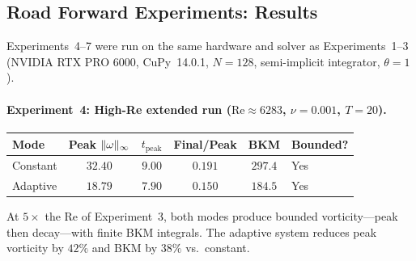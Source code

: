 \subsection{Road Forward Experiments: Results}
\label{app:ns:road_data}

Experiments~4--7 were run on the same hardware and solver
as Experiments~1--3 (NVIDIA RTX PRO 6000, CuPy~14.0.1,
$N=128$, semi-implicit integrator, $\theta=1$).

\paragraph{Experiment~4: High-Re extended run
($\mathrm{Re} \approx 6283$, $\nu = 0.001$, $T = 20$).}
\begin{center}
\begin{tabular}{@{}lccccl@{}}
\toprule
Mode & Peak $\lVert \omega \rVert_\infty$ & $t_{\mathrm{peak}}$
  & Final/Peak & BKM & Bounded? \\
\midrule
Constant & $32.40$ & $9.00$ & $0.191$ & $297.4$ & Yes \\
Adaptive & $18.79$ & $7.90$ & $0.150$ & $184.5$ & Yes \\
\bottomrule
\end{tabular}
\end{center}
At $5\times$ the Re of Experiment~3, both modes produce
bounded vorticity---peak then decay---with finite BKM
integrals.  The adaptive system reduces peak vorticity by
$42\%$ and BKM by $38\%$ vs.\ constant.

